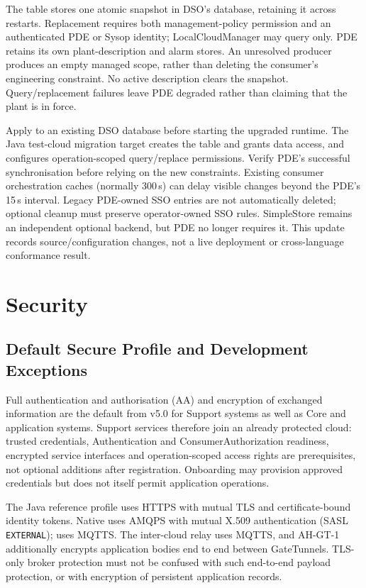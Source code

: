 \documentclass[a4paper]{arrowhead}
\newcommand{\svc}[1]{\textcolor{ArrowheadPurple}{\textit{\ahbreak{#1}}}}    %
\begin{document}
The  table stores one atomic snapshot in DSO's database,
retaining it across restarts. Replacement requires both management-policy permission and
an authenticated PDE or Sysop identity; LocalCloudManager may query only. PDE retains its
own plant-description and alarm stores. An unresolved producer produces an empty managed
scope, rather than deleting the consumer's engineering constraint. No active description
clears the snapshot. Query/replacement failures leave PDE degraded rather than claiming
that the plant is in force.

Apply  to an existing DSO database before starting the
upgraded runtime. The Java test-cloud migration target creates the table and grants data
access, and configures operation-scoped query/replace permissions. Verify PDE's successful
synchronisation before relying on the new constraints. Existing consumer orchestration
caches (normally 300\,s) can delay visible changes beyond the PDE's 15\,s interval.
Legacy PDE-owned SSO entries are not automatically deleted; optional cleanup must preserve
operator-owned SSO rules. SimpleStore remains an independent optional backend, but PDE no
longer requires it. This update records source/configuration changes, not a live deployment
or cross-language conformance result.

\section{Security}
\label{sec:security}

\subsection{Default Secure Profile and Development Exceptions}
\label{sec:secure-default}
Full authentication and authorisation (AA) and encryption of exchanged information
are the default from v5.0 for Support systems as well as Core and application systems.
Support services therefore join an already protected cloud: trusted credentials,
Authentication and ConsumerAuthorization readiness, encrypted service interfaces
and operation-scoped access rights are prerequisites, not optional additions after
registration. Onboarding may provision approved credentials but does not itself
permit application operations.

The Java reference profile uses HTTPS with mutual TLS and certificate-bound identity
tokens. Native \svc{sysMonitor} uses AMQPS with mutual X.509 authentication
(SASL \texttt{EXTERNAL}); \svc{sysMonitorData} uses MQTTS. The inter-cloud relay uses
MQTTS, and AH-GT-1 additionally encrypts application bodies end to end between
GateTunnels. TLS-only broker protection must not be confused with such end-to-end
payload protection, or with encryption of persistent application records.
\end{document}
